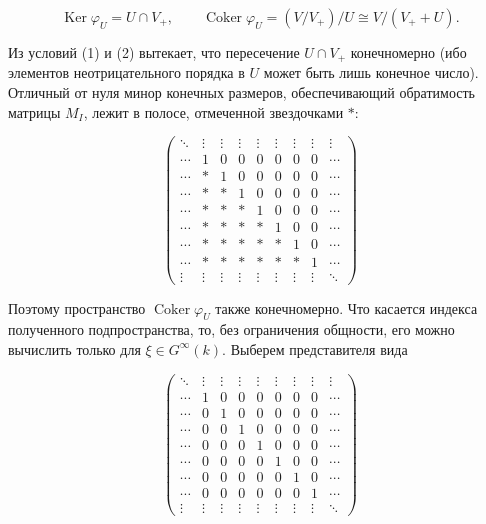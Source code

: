 \documentclass{article}
\theoremstyle{definition}
\theoremstyle{definition} %
\theoremstyle{remark}     %
\theoremstyle{definition}
\theoremstyle{definition}
\theoremstyle{definition}
\theoremstyle{definition}
\theoremstyle{definition}
\theoremstyle{definition}
\theoremstyle{definition}
\theoremstyle{definition}
\begin{document}
\[
\operatorname{Ker} \varphi_U = U \cap V_+,
\qquad
\operatorname{Coker} \varphi_U = (V/V_+) / U \cong V / (V_+ + U).
\]

Из условий (1) и (2) вытекает, что пересечение \( U \cap V_+ \) конечномерно (ибо элементов неотрицательного порядка в \( U \) может быть лишь конечное число). Отличный от нуля минор конечных размеров, обеспечивающий обратимость матрицы \( M_I \), лежит в полосе, отмеченной звездочками \( * \):









    
\[
\begin{pmatrix}
\ddots & \vdots & \vdots & \vdots & \vdots & \vdots & \vdots & \vdots & \vdots \\
\cdots & 1 & 0 & 0 & 0 & 0 & 0 & 0 & \cdots \\
\cdots & * & 1 & 0 & 0 & 0 & 0 & 0 & \cdots \\
\cdots & * & * & 1 & 0 & 0 & 0 & 0 & \cdots \\
\cdots & * & * & * & 1 & 0 & 0 & 0 & \cdots \\
\cdots & * & * & * & * & 1 & 0 & 0 & \cdots \\
\cdots & * & * & * & * & * & 1 & 0 & \cdots \\
\cdots & * & * & * & * & * & * & 1 & \cdots \\
\vdots & \vdots & \vdots & \vdots & \vdots & \vdots & \vdots & \vdots & \ddots
\end{pmatrix}
\]

Поэтому пространство \(\operatorname{Coker} \varphi_U\) также конечномерно. Что касается индекса полученного подпространства, то, без ограничения общности, его можно вычислить только для \(\xi \in G^\infty(k)\). Выберем представителя вида


    
\[
\begin{pmatrix}
\ddots & \vdots & \vdots & \vdots & \vdots & \vdots & \vdots & \vdots & \vdots \\
\cdots & 1 & 0 & 0 & 0 & 0 & 0 & 0 & \cdots \\
\cdots & 0 & 1 & 0 & 0 & 0 & 0 & 0 & \cdots \\
\cdots & 0 & 0 & 1 & 0 & 0 & 0 & 0 & \cdots \\
\cdots & 0 & 0 & 0 & 1 & 0 & 0 & 0 & \cdots \\
\cdots & 0 & 0 & 0 & 0 & 1 & 0 & 0 & \cdots \\
\cdots & 0 & 0 & 0 & 0 & 0 & 1 & 0 & \cdots \\
\cdots & 0 & 0 & 0 & 0 & 0 & 0 & 1 & \cdots \\
\vdots & \vdots & \vdots & \vdots & \vdots & \vdots & \vdots & \vdots & \ddots
\end{pmatrix}
\]
\end{document}
